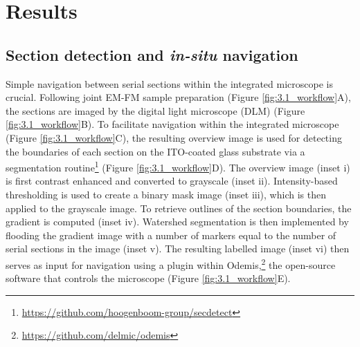 \section{Results}
\label{sec:3.3_results}


\subsection{Section detection and \textit{in-situ} navigation}
\label{sec:3R_secdetect}
Simple navigation between serial sections within the integrated microscope is crucial. Following joint EM-FM sample preparation (Figure \ref{fig:3.1_workflow}A), the sections are imaged by the digital light microscope (DLM) (Figure \ref{fig:3.1_workflow}B). To facilitate navigation within the integrated microscope (Figure \ref{fig:3.1_workflow}C), the resulting overview image is used for detecting the boundaries of each section on the ITO-coated glass substrate via a segmentation routine\footnote{\href{https://github.com/hoogenboom-group/secdetect}{https://github.com/hoogenboom-group/secdetect}} (Figure \ref{fig:3.1_workflow}D). The overview image (inset i) is first contrast enhanced and converted to grayscale (inset ii). Intensity-based thresholding is used to create a binary mask image (inset iii), which is then applied to the grayscale image. To retrieve outlines of the section boundaries, the gradient is computed (inset iv). Watershed segmentation is then implemented by flooding the gradient image with a number of markers equal to the number of serial sections in the image (inset v). The resulting labelled image (inset vi) then serves as input for navigation using a plugin within Odemis,\footnote{\href{https://github.com/delmic/odemis}{https://github.com/delmic/odemis}} the open-source software that controls the microscope (Figure \ref{fig:3.1_workflow}E).

